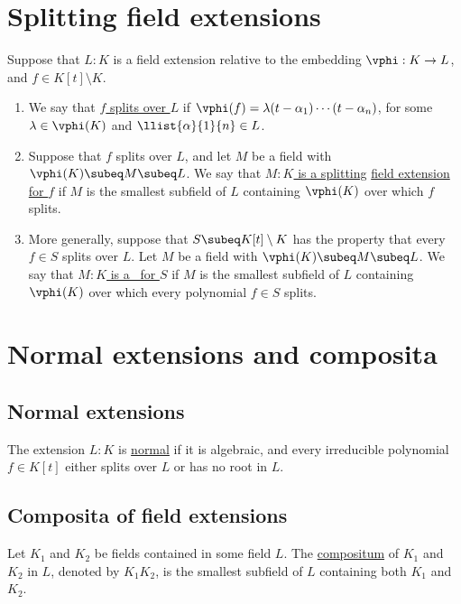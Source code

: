 \documentclass{article}
\begin{document}
\section{Splitting field extensions}
  \begin{tdefinition}
    Suppose that \( L:K \) is a field extension relative to the embedding \( \vphi : K\to L \), and \( f\in K[t]\setminus K \). \begin{enumerate}[label=(\roman*)]
      \item We say that \ul{\( f \) splits over \( L \)} if \( \vphi(f)=\lambda(t-\alpha_1)\cdots(t-\alpha_n) \), for some \( \lambda\in \vphi(K) \) and \( \llist{\alpha}{1}{n}\in L \).
      \item Suppose that \( f \) splits over \( L \), and let \( M \) be a field with \( \vphi(K)\subeq M\subeq L \). We say that \ul{\( M:K \) is a splitting} \ul{field extension for \( f \)} if \( M \) is the smallest subfield of \( L \) containing \( \vphi(K) \) over which \( f \) splits.
      \item More generally, suppose that \( S\subeq K[t]\setminus K \) has the property that every \( f\in S \) splits over \( L \). Let \( M \) be a field with \( \vphi(K)\subeq M\subeq L \). We say that \ul{\( M:K \) is a \sfe~for \( S \)} if \( M \) is the smallest subfield of \( L \) containing \( \vphi(K) \) over which every polynomial \( f\in S \) splits.
    \end{enumerate}
  \end{tdefinition}

\section{Normal extensions and composita}
\subsection{Normal extensions}
  \begin{tdefinition}
    The extension \( L:K \) is \ul{normal} if it is algebraic, and every irreducible polynomial \( f\in K[t] \) either splits over \( L \) or has no root in \( L \).
  \end{tdefinition}

\subsection{Composita of field extensions}
  \begin{tdefinition}[Compositum]
    Let \( K_1 \) and \( K_2 \) be fields contained in some field \( L \).
    The \ul{compositum} of \( K_1 \) and \( K_2 \) in \( L \), denoted by \( K_1K_2 \), is the smallest subfield of \( L \) containing both \( K_1 \) and \( K_2 \).
  \end{tdefinition}
\end{document}
